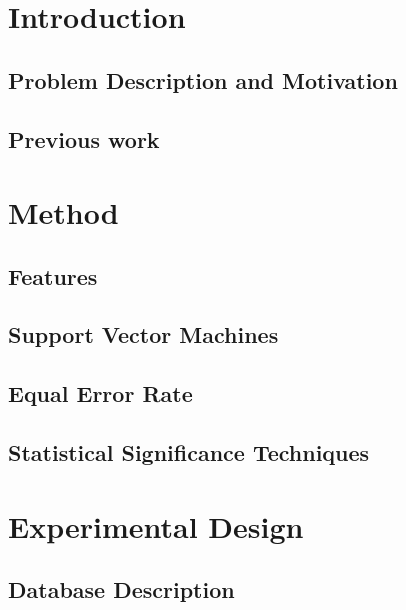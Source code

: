 \documentclass[11pt,a4paper]{tesis}
\begin{document}
\linespread{1.6}
\tableofcontents
\chapter{Introduction}
	\section{Problem Description and Motivation}
	\section{Previous work}
		
\chapter{Method}
	
	\section{Features}
		
		
		
	\section{Support Vector Machines}
		
	\section{Equal Error Rate}
		
	\section{Statistical Significance Techniques}
		
		

\chapter{Experimental Design}
	\section{Database Description}
		
\end{document}

